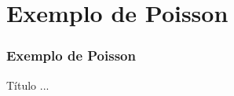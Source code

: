 \documentclass[../main/main.tex]{subfiles}
\begin{document}
\section{Exemplo de Poisson}





\begin{frame}
	\frametitle{Exemplo de Poisson}
\end{frame}



\begin{frame}{Título}
	...
\end{frame}
\end{document}
